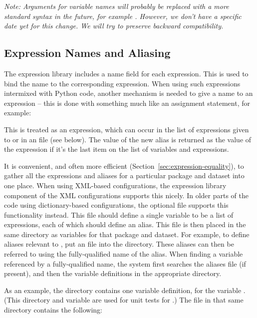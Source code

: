 \emph{Note: Arguments for variable names will probably be replaced with a
  more standard syntax in the future, for example
  .  However, we don't have
  a specific date yet for this change.  We will try to preserve backward
  compatibility.}

\subsection{Expression Names and Aliasing}
\label{sec:urbansim-tutorial-aliasing}

The expression library includes a name field for each expression.  This is
used to bind the name to the corresponding expression.  When using such
expressions intermixed with Python code, another mechanism is needed to
give a name to an expression -- this is done with something much like an
assignment statement, for example:


This is treated as an expression, which can occur in the list of
expressions given to  or in an 
file (see below).  The value of the new alias is returned as the value of
the expression if it's the last item on the list of variables and
expressions.

It is convenient, and often more efficient
(Section~\ref{sec:expression-equality}), to gather all the expressions and
aliases for a particular package and dataset into one place.  When using 
XML-based configurations, the expression library component of the XML configurations
supports this nicely.  In older parts of the code using dictionary-based
configurations, the optional  
file supports this functionality instead.
This file should define a single variable  to be a list of expressions,
each of which should define an alias.  This file is then placed in the same
directory as variables for that package and dataset.  For example, to
define aliases relevant to , put an
 file into the  directory.  These
aliases can then be referred to using the fully-qualified name of the
alias.  When finding a variable referenced by a fully-qualified name, the
system first searches the aliases file (if present), and then the variable
definitions in the appropriate directory.

As an example, the directory  contains one
variable definition, for the variable .  (This
directory and variable are used for unit tests for .)
The file  in that same directory contains the following:

